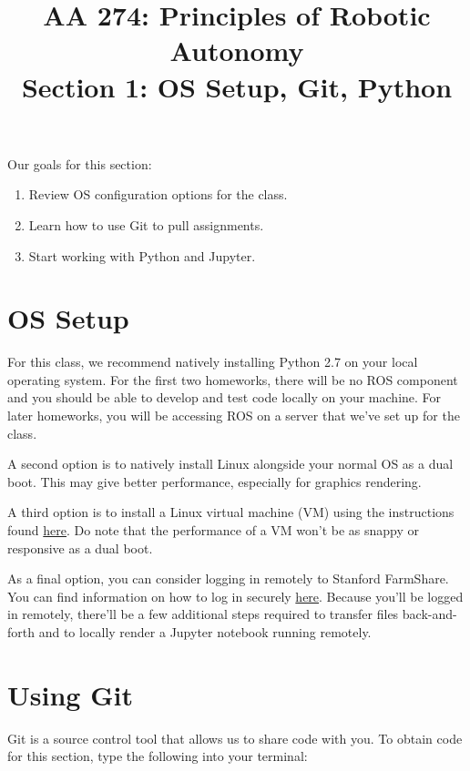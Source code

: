 \documentclass{article}
\title{AA 274: Principles of Robotic Autonomy \\ Section 1: OS Setup, Git, Python}
\date{}
\begin{document}
\maketitle
\pagestyle{fancy}

Our goals for this section: \begin{enumerate}
    \item Review OS configuration options for the class.
    \item Learn how to use Git to pull assignments.
    \item Start working with Python and Jupyter.
\end{enumerate}

\section{OS Setup}
For this class, we recommend natively installing Python 2.7 on your local operating system. For the first two homeworks, there will be no ROS component and you should be able to develop and test code locally on your machine. For later homeworks, you will be accessing ROS on a server that we've set up for the class.


A second option is to natively install Linux alongside your normal OS as a dual boot. This may give better performance, especially for graphics rendering. %

A third option is to install a Linux virtual machine (VM) using the instructions found  \href{https://docs.google.com/document/d/1ley_pauriyx0PrH8XYfkIrZwXnL3s-xBQvcUY6RE02I/edit#}{here}. Do note that the performance of a VM won't be as snappy or responsive as a dual boot.

As a final option, you can consider logging in remotely to Stanford FarmShare. You can find information on how to log in securely \href{https://srcc.stanford.edu/farmshare2/connecting}{here}. Because you'll be logged in remotely, there'll be a few additional steps required to transfer files back-and-forth and to locally render a Jupyter notebook running remotely.

\section{Using Git}
Git is a source control tool that allows us to share code with you. To obtain code for this section, type the following into your terminal:
\end{document}
